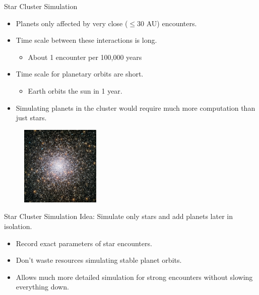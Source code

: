 \documentclass{beamer}
\begin{document}
\begin{frame}{Star Cluster Simulation}
    \begin{itemize}
        \item Planets only affected by very close ($\le $30 AU) encounters.
        \item Time scale between these interactions is long.
            \begin{itemize}
                \item About 1 encounter per 100,000 years
            \end{itemize}
        \item Time scale for planetary orbits are short.
            \begin{itemize}
                \item Earth orbits the sun in 1 year.
            \end{itemize}
        \item Simulating planets in the cluster would require much more
            computation than just stars.
    \end{itemize}
    \begin{figure}
        \includegraphics[height=1.5in]{star_cluster.jpg}
    \end{figure}
\end{frame}

\begin{frame}{Star Cluster Simulation}
    Idea: Simulate only stars and add planets later in isolation.
    \begin{itemize}
        \item Record exact parameters of star encounters.
        \item Don't waste resources simulating stable planet orbits.
        \item Allows much more detailed simulation for strong encounters
            without slowing everything down.
    \end{itemize}
\end{frame}
\end{document}
